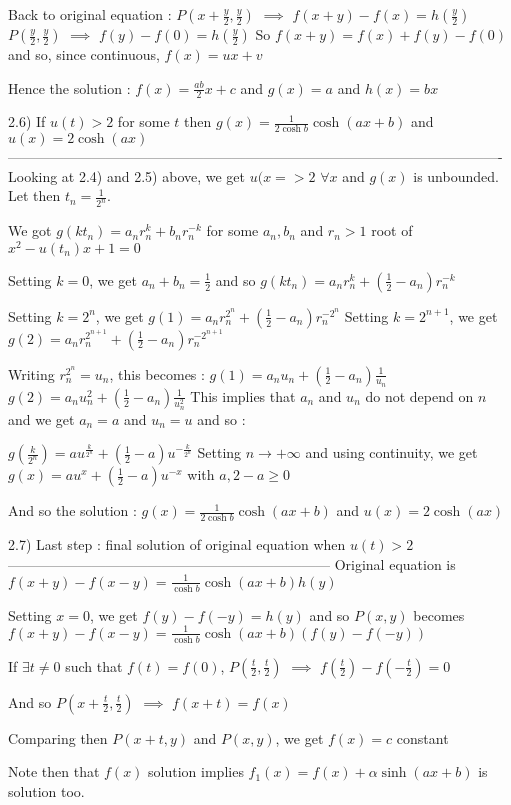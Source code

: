 \begin{solution}
Back to original equation :
$P(x+\frac y2,\frac y2)$ $\implies$ $f(x+y)-f(x)=h(\frac y2)$
$P(\frac y2,\frac y2)$ $\implies$ $f(y)-f(0)=h(\frac y2)$
So $f(x+y)=f(x)+f(y)-f(0)$ and so, since continuous, $f(x)=ux+v$

Hence the solution : $f(x)=\frac {ab}2x+c$ and $g(x)=a$ and $h(x)=bx$

2.6) If $u(t)>2$ for some $t$ then $g(x)=\frac 1{2\cosh b}\cosh(ax+b)$ and $u(x)=2\cosh(ax)$
----------------------------------------------------------------------------------------------------------
Looking at 2.4) and 2.5) above, we get $u(x=>2$ $\forall x$ and $g(x)$ is unbounded.
Let then $t_n=\frac 1{2^n}$.

We got $g(kt_n)=a_nr_n^k+b_nr_n^{-k}$ for some $a_n,b_n$ and $r_n>1$ root of $x^2-u(t_n)x+1=0$

Setting $k=0$, we get $a_n+b_n=\frac 12$ and so $g(kt_n)=a_nr_n^k+(\frac 12-a_n)r_n^{-k}$

Setting $k=2^n$, we get $g(1)=a_nr_n^{2^n}+(\frac 12-a_n)r_n^{-2^n}$
Setting $k=2^{n+1}$, we get $g(2)=a_nr_n^{2^{n+1}}+(\frac 12-a_n)r_n^{-2^{n+1}}$

Writing $r_n^{2^n}=u_n$, this becomes :
$g(1)=a_nu_n+(\frac 12-a_n)\frac 1{u_n}$
$g(2)=a_nu_n^2+(\frac 12-a_n)\frac 1{u_n^2}$
This implies that $a_n$ and $u_n$ do not depend on $n$ and we get $a_n=a$ and $u_n=u$ and so :

$g(\frac k{2^n})=au^{\frac k{2^n}}+(\frac 12-a)u^{-\frac k{2^n}}$
Setting $n\to+\infty$ and using continuity, we get $g(x)=au^x+(\frac 12-a)u^{-x}$ with $a,2-a\ge 0$

And so the solution : $g(x)=\frac 1{2\cosh b}\cosh(ax+b)$ and $u(x)=2\cosh(ax)$

2.7) Last step : final solution of original equation when $u(t)>2$
---------------------------------------------------------------------
Original equation is $f(x+y)-f(x-y)=\frac 1{\cosh b}\cosh(ax+b)h(y)$

Setting $x=0$, we get $f(y)-f(-y)=h(y)$ and so $P(x,y)$ becomes $f(x+y)-f(x-y)=\frac 1{\cosh b}\cosh(ax+b)(f(y)-f(-y))$

If $\exists t\ne 0$ such that $f(t)=f(0)$, $P(\frac t2,\frac t2)$ $\implies$ $f(\frac t2)-f(-\frac t2)=0$

And so $P(x+\frac t2,\frac t2)$ $\implies$ $f(x+t)=f(x)$ 

Comparing then $P(x+t,y)$ and $P(x,y)$, we get $f(x)=c$ constant

Note then that $f(x)$ solution implies $f_1(x)=f(x)+\alpha \sinh (ax+b)$ is solution too.


\end{solution}
